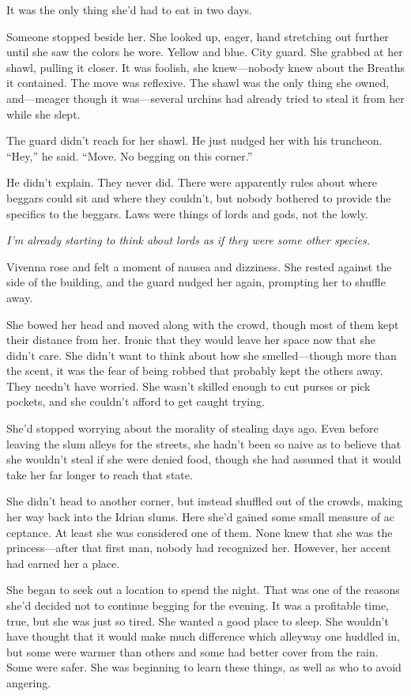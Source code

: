 It was the only thing she’d had to eat in two days.

Someone stopped beside her. She looked up, eager, hand stretching out further until she saw the colors he wore. Yellow and blue. City guard. She grabbed at her shawl, pulling it closer. It was foolish, she knew—nobody knew about the Breaths it contained. The move was reflexive. The shawl was the only thing she owned, and—meager though it was—several urchins had already tried to steal it from her while she slept.

The guard didn’t reach for her shawl. He just nudged her with his truncheon. “Hey,” he said. “Move. No begging on this corner.”

He didn’t explain. They never did. There were apparently rules about where beggars could sit and where they couldn’t, but nobody bothered to provide the specifics to the beggars. Laws were things of lords and gods, not the lowly.

\textit{I’m already starting to think about lords as if they were some other species.}

Vivenna rose and felt a moment of nausea and dizziness. She rested against the side of the building, and the guard nudged her again, prompting her to shuffle away.

She bowed her head and moved along with the crowd, though most of them kept their distance from her. Ironic that they would leave her space now that she didn’t care. She didn’t want to think about how she smelled—though more than the scent, it was the fear of being robbed that probably kept the others away. They needn’t have worried. She wasn’t skilled enough to cut purses or pick pockets, and she couldn’t afford to get caught trying.

She’d stopped worrying about the morality of stealing days ago. Even before leaving the slum alleys for the streets, she hadn’t been so naive as to believe that she wouldn’t steal if she were denied food, though she had assumed that it would take her far longer to reach that state.

She didn’t head to another corner, but instead shuffled out of the crowds, making her way back into the Idrian slums. Here she’d gained some small measure of ac ceptance. At least she was considered one of them. None knew that she was the princess—after that first man, nobody had recognized her. However, her accent had earned her a place.

She began to seek out a location to spend the night. That was one of the reasons she’d decided not to continue begging for the evening. It was a profitable time, true, but she was just so tired. She wanted a good place to sleep. She wouldn’t have thought that it would make much difference which alleyway one huddled in, but some were warmer than others and some had better cover from the rain. Some were safer. She was beginning to learn these things, as well as who to avoid angering.

